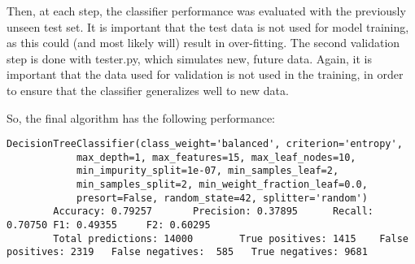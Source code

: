 \documentclass[11pt]{article} %
\begin{document}
Then, at each step, the classifier performance was evaluated with the previously unseen test set. It is important that the test data is not used for model training, as this could (and most likely will) result in over-fitting. The second validation step is done with tester.py, which simulates new, future data. Again, it is important that the data used for validation is not used in the training, in order to ensure that the classifier generalizes well to new data.\medskip

So, the final algorithm has the following performance:
{\tiny
\begin{verbatim}
DecisionTreeClassifier(class_weight='balanced', criterion='entropy',
            max_depth=1, max_features=15, max_leaf_nodes=10,
            min_impurity_split=1e-07, min_samples_leaf=2,
            min_samples_split=2, min_weight_fraction_leaf=0.0,
            presort=False, random_state=42, splitter='random')
        Accuracy: 0.79257       Precision: 0.37895      Recall: 0.70750 F1: 0.49355     F2: 0.60295
        Total predictions: 14000        True positives: 1415    False positives: 2319   False negatives:  585   True negatives: 9681
\end{verbatim}
}
\end{document}
